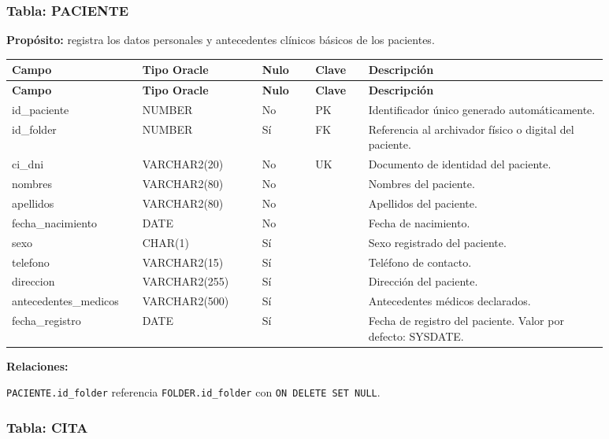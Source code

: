 \subsubsection{Tabla: PACIENTE}

\textbf{Propósito:} registra los datos personales y antecedentes clínicos básicos de los pacientes.\par

\begin{longtable}{p{0.18\linewidth}p{0.18\linewidth}p{0.08\linewidth}p{0.08\linewidth}p{0.36\linewidth}}
\toprule
\textbf{Campo} & \textbf{Tipo Oracle} & \textbf{Nulo} & \textbf{Clave} & \textbf{Descripción} \\
\midrule
\endfirsthead
\toprule
\textbf{Campo} & \textbf{Tipo Oracle} & \textbf{Nulo} & \textbf{Clave} & \textbf{Descripción} \\
\midrule
\endhead
id\_paciente & NUMBER & No & PK & Identificador único generado automáticamente. \\
id\_folder & NUMBER & Sí & FK & Referencia al archivador físico o digital del paciente. \\
ci\_dni & VARCHAR2(20) & No & UK & Documento de identidad del paciente. \\
nombres & VARCHAR2(80) & No &  & Nombres del paciente. \\
apellidos & VARCHAR2(80) & No &  & Apellidos del paciente. \\
fecha\_nacimiento & DATE & No &  & Fecha de nacimiento. \\
sexo & CHAR(1) & Sí &  & Sexo registrado del paciente. \\
telefono & VARCHAR2(15) & Sí &  & Teléfono de contacto. \\
direccion & VARCHAR2(255) & Sí &  & Dirección del paciente. \\
antecedentes\_medicos & VARCHAR2(500) & Sí &  & Antecedentes médicos declarados. \\
fecha\_registro & DATE & Sí &  & Fecha de registro del paciente. Valor por defecto: SYSDATE. \\
\bottomrule
\end{longtable}

\textbf{Relaciones:}\par
\texttt{PACIENTE.id\_folder} referencia \texttt{FOLDER.id\_folder} con \texttt{ON DELETE SET NULL}.\par



\subsubsection{Tabla: CITA}

